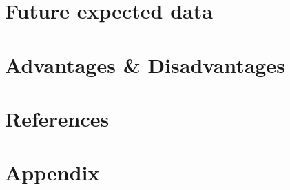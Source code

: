 \documentclass[12pt]{article}
\begin{document}
\section{Future expected data}\label{sec:future-expected-data} %

\section{Advantages \& Disadvantages}\label{sec:advantages-&-disadvantages} %

\section{References}\label{sec:references} %

\section{Appendix}\label{sec:appendix} %
\end{document}
